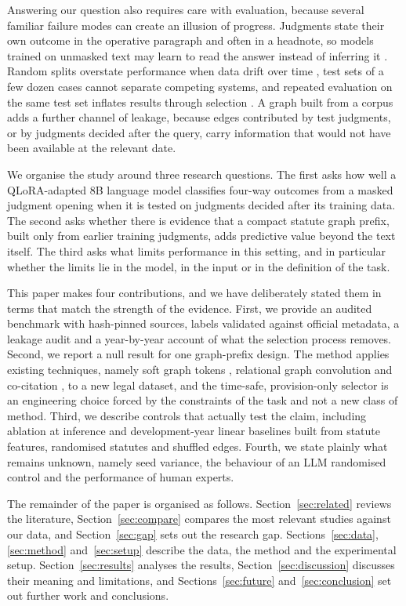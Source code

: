 \documentclass[11pt,a4paper]{article}
\begin{document}
Answering our question also requires care with evaluation, because several familiar failure modes can create an illusion of progress. Judgments state their own outcome in the operative paragraph and often in a headnote, so models trained on unmasked text may learn to read the answer instead of inferring it \cite{r24}. Random splits overstate performance when data drift over time \cite{r25,r26}, test sets of a few dozen cases cannot separate competing systems, and repeated evaluation on the same test set inflates results through selection \cite{r27,r28}. A graph built from a corpus adds a further channel of leakage, because edges contributed by test judgments, or by judgments decided after the query, carry information that would not have been available at the relevant date.

We organise the study around three research questions. The first asks how well a QLoRA-adapted 8B language model classifies four-way outcomes from a masked judgment opening when it is tested on judgments decided after its training data. The second asks whether there is evidence that a compact statute graph prefix, built only from earlier training judgments, adds predictive value beyond the text itself. The third asks what limits performance in this setting, and in particular whether the limits lie in the model, in the input or in the definition of the task.

This paper makes four contributions, and we have deliberately stated them in terms that match the strength of the evidence. First, we provide an audited benchmark with hash-pinned sources, labels validated against official metadata, a leakage audit and a year-by-year account of what the selection process removes. Second, we report a null result for one graph-prefix design. The method applies existing techniques, namely soft graph tokens \cite{r21}, relational graph convolution \cite{r32} and co-citation \cite{r31}, to a new legal dataset, and the time-safe, provision-only selector is an engineering choice forced by the constraints of the task and not a new class of method. Third, we describe controls that actually test the claim, including ablation at inference and development-year linear baselines built from statute features, randomised statutes and shuffled edges. Fourth, we state plainly what remains unknown, namely seed variance, the behaviour of an LLM randomised control and the performance of human experts.

The remainder of the paper is organised as follows. Section~\ref{sec:related} reviews the literature, Section~\ref{sec:compare} compares the most relevant studies against our data, and Section~\ref{sec:gap} sets out the research gap. Sections~\ref{sec:data}, \ref{sec:method} and~\ref{sec:setup} describe the data, the method and the experimental setup. Section~\ref{sec:results} analyses the results, Section~\ref{sec:discussion} discusses their meaning and limitations, and Sections~\ref{sec:future} and~\ref{sec:conclusion} set out further work and conclusions.
\end{document}
